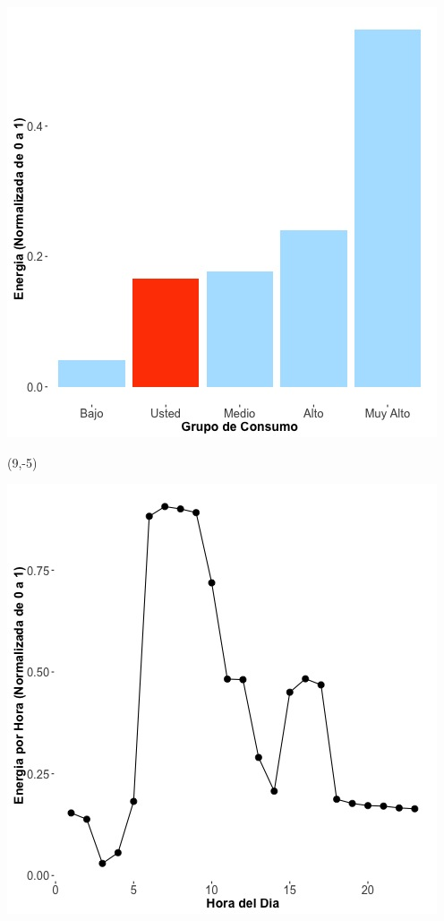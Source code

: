 \documentclass{article}\usepackage[]{graphicx}\usepackage[]{color}
\newenvironment{knitrout}{}{} %
\begin{document}
\begin{knitrout}
\color{fgcolor}
\includegraphics[scale=0.65]{figure/A19_neighbor_plot} 
\end{knitrout}

 \begin{textblock}{1}(9,-5)
\begin{minipage}{20em}
\begingroup

\endgroup
\end{minipage}
\end{textblock}


\begin{knitrout}
\color{fgcolor}
\includegraphics[scale=0.65]{figure/A19_plot_norm_median} 
\end{knitrout}
\end{document}
